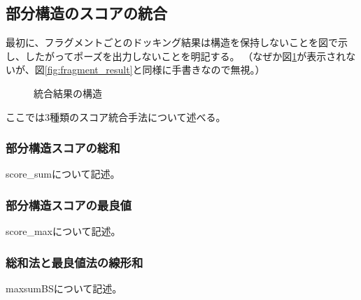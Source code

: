 \subsection{部分構造のスコアの統合}
最初に、フラグメントごとのドッキング結果は構造を保持しないことを図で示し、したがってポーズを出力しないことを明記する。
（なぜか図\ref{fig:fragment_docking_result}が表示されないが、図\ref{fig:fragment_result}と同様に手書きなので無視。）
\begin{figure}[htp]
 \begin{center}
  \caption{統合結果の構造}
  \label{fig:fragment_docking_result}
 \end{center}
\end{figure}

ここでは3種類のスコア統合手法について述べる。
\subsubsection{部分構造スコアの総和}
score\_sumについて記述。
\subsubsection{部分構造スコアの最良値}
score\_maxについて記述。
\subsubsection{総和法と最良値法の線形和}
maxsumBSについて記述。

